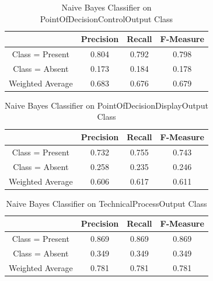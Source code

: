 \documentclass[11pt, notitlepage,abstracton,oneside]{article}   	%
\begin{document}
\begin{table}[H]
    \caption{Naive Bayes Classifier on PointOfDecisionControlOutput Class}
        \begin{center}
        \begin{tabular}{|c|c|c|c|}
            \hline
            & Precision & Recall & F-Measure \\ \hline
            Class = Present & 0.804 & 0.792 & 0.798 \\ \hline
            Class = Absent & 0.173 & 0.184 & 0.178 \\ \hline
            Weighted Average & 0.683 & 0.676 & 0.679 \\ \hline
        \end{tabular}
        \end{center}
    \label{default}
\end{table}%

\begin{table}[H]
    \caption{Naive Bayes Classifier on PointOfDecisionDisplayOutput Class}
        \begin{center}
        \begin{tabular}{|c|c|c|c|}
            \hline
            & Precision & Recall & F-Measure \\ \hline
            Class = Present & 0.732 & 0.755 & 0.743 \\ \hline
            Class = Absent & 0.258 & 0.235 & 0.246 \\ \hline
            Weighted Average & 0.606 & 0.617 & 0.611 \\ \hline
        \end{tabular}
        \end{center}
    \label{default}
\end{table}%

\begin{table}[H]
    \caption{Naive Bayes Classifier on TechnicalProcessOutput Class}
        \begin{center}
        \begin{tabular}{|c|c|c|c|}
            \hline
            & Precision & Recall & F-Measure \\ \hline
            Class = Present & 0.869 & 0.869 & 0.869 \\ \hline
            Class = Absent & 0.349 & 0.349 & 0.349 \\ \hline
            Weighted Average & 0.781 & 0.781 & 0.781 \\ \hline
        \end{tabular}
        \end{center}
    \label{default}
\end{table}%
\end{document}
